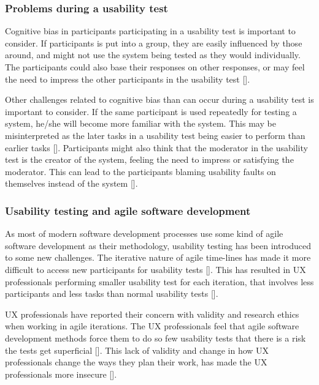 \subsubsection{Problems during a usability test} \label{sec:problems-during-a-usability-test}
Cognitive bias in participants participating in a usability test is important to consider. If participants is put into a group, they are easily influenced by those around, and might not use the system being tested as they would individually. The participants could also base their responses on other responses, or may feel the need to impress the other participants in the usability test [\cite{dn_2016}].

Other challenges related to cognitive bias than can occur during a usability test is important to consider. If the same participant is used repeatedly for testing a system, he/she will become more familiar with the system. This may be misinterpreted as the later tasks in a usability test being easier to perform than earlier tasks [\cite{dn_2016}]. Participants might also think that the moderator in the usability test is the creator of the system, feeling the need to impress or satisfying the moderator. This can lead to the participants blaming usability faults on themselves instead of the system [\cite{dn_2016}].

\subsubsection{Usability testing and agile software development}
As most of modern software development processes use some kind of agile software development as their methodology, usability testing has been introduced to some new challenges. The iterative nature of agile time-lines has made it more difficult to access new participants for usability tests [\cite{ds_2014}]. This has resulted in UX professionals performing smaller usability test for each iteration, that involves less participants and less tasks than normal usability tests [\cite{ln_2012}].

UX professionals have reported their concern with validity and research ethics when working in agile iterations. The UX professionals feel that agile software development methods force them to do so few usability tests that there is a risk the tests get superficial [\cite{ln_2012}]. This lack of validity and change in how UX professionals change the ways they plan their work, has made the UX professionals more insecure [\cite{ln_2012}].

